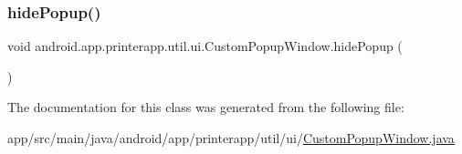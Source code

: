 \subsubsection{\texorpdfstring{hide\+Popup()}{hidePopup()}}
{\footnotesize\ttfamily void android.\+app.\+printerapp.\+util.\+ui.\+Custom\+Popup\+Window.\+hide\+Popup (\begin{DoxyParamCaption}{ }\end{DoxyParamCaption})}



The documentation for this class was generated from the following file\+:\begin{DoxyCompactItemize}
\item 
app/src/main/java/android/app/printerapp/util/ui/\hyperlink{_custom_popup_window_8java}{Custom\+Popup\+Window.\+java}\end{DoxyCompactItemize}
